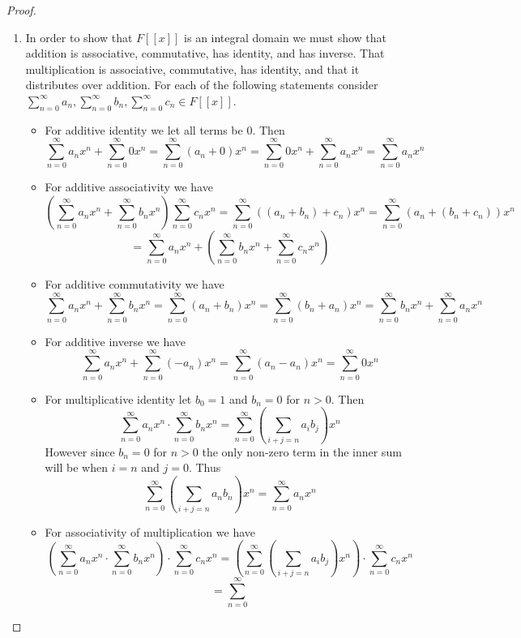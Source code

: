 \documentclass[10pt]{article}
\theoremstyle{plain}
\theoremstyle{remark}
\begin{document}
\begin{proof}
  \begin{enumerate}
  \item In order to show that $F[[x]]$ is an integral domain we
    must show that addition is associative, commutative, has identity,
    and has inverse. That multiplication is associative, commutative,
    has identity, and that it distributes
    over addition. For each of the following statements consider
    $\sum_{n=0}^\infty a_n,\sum_{n=0}^\infty b_n,\sum_{n=0}^\infty c_n\in F[[x]]$.
    \begin{itemize}
    \item For additive identity we let all terms be $0$. Then
      \[ \sum_{n=0}^\infty a_nx^n +\sum_{n=0}^\infty 0x^n=\sum_{n=0}^\infty (a_n+0)x^n=\sum_{n=0}^\infty 0x^n+\sum_{n=0}^\infty a_nx^n=
        \sum_{n=0}^\infty a_nx^n \]
    \item For additive associativity we have
      \[ \left(\sum_{n=0}^\infty a_nx^n + \sum_{n=0}^\infty b_nx^n\right) \sum_{n=0}^\infty c_nx^n
        = \sum_{n=0}^\infty ((a_n+b_n)+c_n)x^n=\sum_{n=0}^\infty (a_n+(b_n+c_n))x^n\]\[
        = \sum_{n=0}^\infty a_nx^n+\left(\sum_{n=0}^\infty b_nx^n+\sum_{n=0}^\infty c_nx^n\right)\]
    \item For additive commutativity we have
      \[ \sum_{n=0}^\infty a_nx^n + \sum_{n=0}^\infty b_nx^n=\sum_{n=0}^\infty (a_n+b_n)x^n
        = \sum_{n=0}^\infty (b_n+a_n)x^n=\sum_{n=0}^\infty b_nx^n+\sum_{n=0}^\infty a_nx^n\]
    \item For additive inverse we have
      \[ \sum_{n=0}^\infty a_nx^n + \sum_{n=0}^\infty (-a_n)x^n = \sum_{n=0}^\infty (a_n-a_n)x^n=
        \sum_{n=0}^\infty 0x^n \]
    \item For multiplicative identity let $b_0=1$ and $b_n=0$ for $n>0$. Then
      \[ \sum_{n=0}^\infty a_nx^n\cdot\sum_{n=0}^\infty b_nx^n=  \sum_{n=0}^\infty\left(\sum_{i+j=n}a_ib_j\right)x^n\]
      However since $b_n=0$ for $n>0$ the only non-zero term in the inner sum
      will be when $i=n$ and $j=0$. Thus
      \[ \sum_{n=0}^\infty\left(\sum_{i+j=n}a_nb_n\right)x^n=\sum_{n=0}^\infty a_nx^n \]
    \item For associativity of multiplication we have
      \[ 
        \left(
          \sum_{n=0}^\infty a_nx^n\cdot \sum_{n=0}^\infty b_nx^n
        \right)\cdot \sum_{n=0}^\infty c_nx^n
        = 
        \left(
          \sum_{n=0}^\infty 
          \left(
            \sum_{i+j=n}a_ib_j
          \right)x^n
        \right)\cdot \sum_{n=0}^\infty c_nx^n\]\[
        = \sum_{n=0}^\infty 
\]
\end{itemize}
\end{enumerate}
\end{proof}
\end{document}
